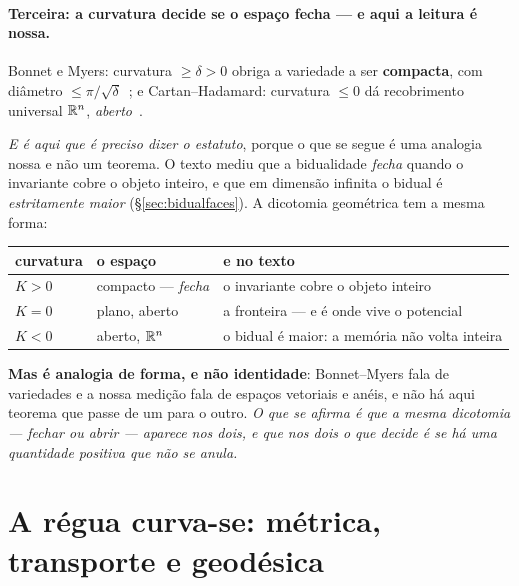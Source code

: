 \documentclass[livro.tex]{subfiles}
\begin{document}

\paragraph{Terceira: a curvatura decide se o espaço fecha --- e aqui a leitura é nossa.} Bonnet e
Myers: curvatura $\geq\delta>0$ obriga a variedade a ser \textbf{compacta}, com diâmetro
$\leq\pi/\sqrt\delta$~\cite{myers1941}; e Cartan--Hadamard: curvatura $\leq0$ dá recobrimento
universal $\mathbb R^{n}$, \emph{aberto}~\cite{do-carmo}.

\smallskip
\noindent \emph{E é aqui que é preciso dizer o estatuto}, porque o que se segue é uma analogia
nossa e não um teorema. O texto mediu que a bidualidade \emph{fecha} quando o invariante cobre o
objeto inteiro, e que em dimensão infinita o bidual é \emph{estritamente maior}
(\S\ref{sec:bidualfaces}). A dicotomia geométrica tem a mesma forma:

\begin{center}\small
\begin{tabular}{@{}lll@{}}
\toprule
curvatura & o espaço & e no texto \\
\midrule
$K>0$ & compacto --- \emph{fecha} & o invariante cobre o objeto inteiro \\
$K=0$ & plano, aberto & a fronteira --- e é onde vive o potencial \\
$K<0$ & aberto, $\mathbb R^{n}$ & o bidual é maior: a memória não volta inteira \\
\bottomrule
\end{tabular}
\end{center}

\noindent \textbf{Mas é analogia de forma, e não identidade}: Bonnet--Myers fala de variedades e a
nossa medição fala de espaços vetoriais e anéis, e não há aqui teorema que passe de um para o
outro. \emph{O que se afirma é que a mesma dicotomia --- fechar ou abrir --- aparece nos dois, e
que nos dois o que decide é se há uma quantidade positiva que não se anula.}

\section{A régua curva-se: métrica, transporte e geodésica}\label{sec:geometrica}
\end{document}
